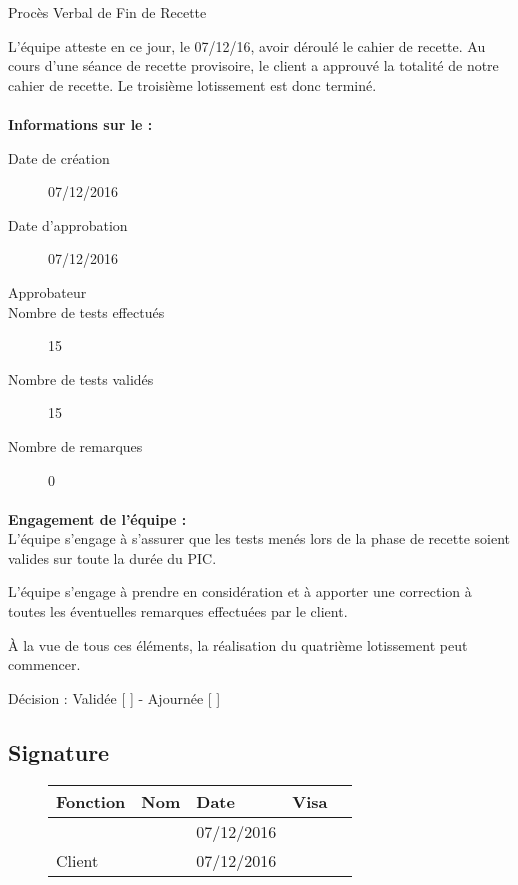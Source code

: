 \documentclass[asi, sansVersion]{picInsa}
\begin{document}
 
 \begin{center}
  \LARGE{}
    Procès Verbal de Fin de Recette\\
 \end{center}
 
 \normalsize{}
 
L'équipe \nomEquipe{} atteste en ce jour, le 07/12/16, avoir déroulé le cahier de recette.
Au cours d'une séance de recette provisoire, le client a approuvé la totalité de notre cahier de recette. Le troisième lotissement est donc terminé.


\paragraph{}
\textbf{Informations sur le \CDR :}

\begin{description}
  \item[Date de création]07/12/2016
  \item[Date d'approbation]07/12/2016
  \item[Approbateur]\nomClient
  \item[Nombre de tests effectués]15
  \item[Nombre de tests validés]15
  \item[Nombre de remarques]0
\end{description}


\paragraph{}
\textbf{Engagement de l'équipe :}\\


L'équipe \nomEquipe{} s'engage à s'assurer que les tests menés lors de la phase de recette soient valides sur toute la durée du PIC.


L'équipe \nomEquipe{} s'engage à prendre en considération et à apporter une correction à toutes les éventuelles remarques effectuées par le client.

À la vue de tous ces éléments, la réalisation du quatrième lotissement peut commencer.

\begin{center}
Décision : Validée [ \checkmark{} ] - Ajournée [ ]
\end{center}

\subsection*{Signature}
\begin{figure}[H]
		\centering
		\begin{tabularx}{17cm}{|p{4cm}|X|X|X|X|}
		\hline
		\rowcolor[gray]{0.85} Fonction & Nom & Date & Visa \\
		\hline
		\CP{} & \Pierre{} & 07/12/2016 & \\
		\hline
		Client & \nomClient & 07/12/2016 & \\
		\hline
		\end{tabularx}
\end{figure}
\end{document}
